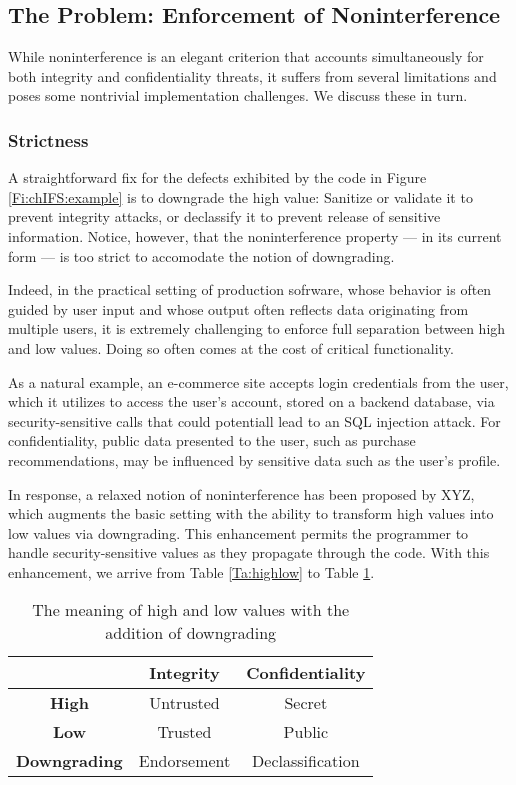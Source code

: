 \subsection{The Problem: Enforcement of Noninterference}

While noninterference is an elegant criterion that accounts simultaneously for both integrity and confidentiality threats, it suffers from several limitations and poses some nontrivial implementation challenges. We discuss these in turn.

\subsubsection{Strictness}

A straightforward fix for the defects exhibited by the code in Figure \ref{Fi:chIFS:example} is to downgrade the high value: Sanitize or validate it to prevent integrity attacks, or declassify it to prevent release of sensitive information. Notice, however, that the noninterference property --- in its current form --- is too strict to accomodate the notion of downgrading.

Indeed, in the practical setting of production sofrware, 
whose behavior is often guided by user input and whose output often reflects data originating from multiple users, it is extremely challenging to enforce full separation between high and low values. Doing so often comes at the cost of critical functionality.

As a natural example, an e-commerce site accepts login credentials from the user, which it utilizes to access the user's account, stored on a backend database, via security-sensitive calls that could potentiall lead to an SQL injection attack. For confidentiality, public data presented to the user, such as purchase recommendations, may be influenced by sensitive data such as the user's profile.

In response, a relaxed notion of noninterference has been proposed by XYZ, which augments the basic setting with the ability to transform high values into low values via downgrading. This enhancement permits the programmer to handle security-sensitive values as they propagate through the code. With this enhancement, we arrive from Table \ref{Ta:highlow} to Table \ref{Ta:highlowExtended}.

\begin{table}
	\begin{center}
		\begin{tabular}{|c|c|c|}
			\hline
			& {\bf Integrity} & {\bf Confidentiality} \\ \hline
			{\bf High}	& Untrusted & Secret \\ \hline
			{\bf Low} & Trusted & Public \\ \hline		
			{\bf Downgrading} & Endorsement & Declassification \\
			\hline
		\end{tabular}
	\end{center}
	\caption{\label{Ta:highlowExtended}The meaning of high and low values with the addition of downgrading}
\end{table} 

